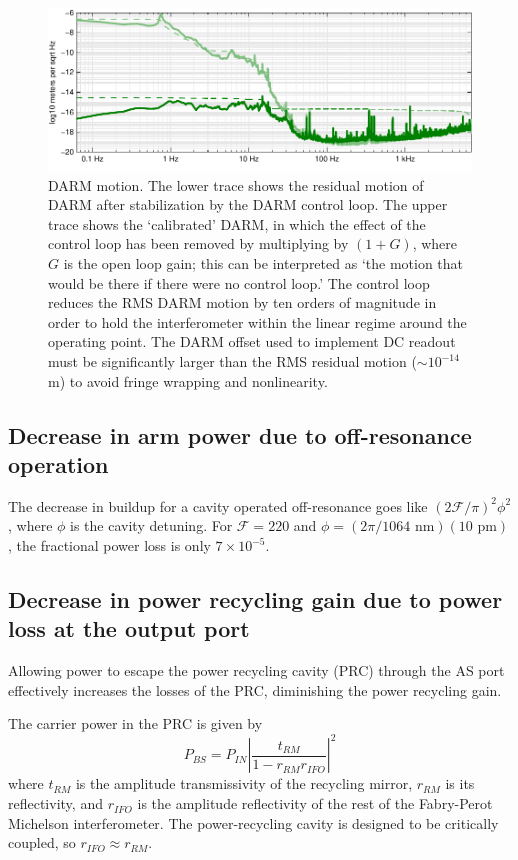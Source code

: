 \begin{figure}[p]
\centerline{\includegraphics[width=\columnwidth]{figures/residualDARM.pdf}}
\caption[Residual DARM motion]{\label{fig:residual-DARM}DARM
  motion. The lower trace shows the residual motion of DARM after
  stabilization by the DARM control loop.  The upper trace shows the
  `calibrated' DARM, in which the effect of the control loop has been
  removed by multiplying by $(1+G)$, where $G$ is the open loop gain;
  this can be interpreted as `the motion that would be there if there
  were no control loop.'  The control loop reduces the RMS DARM motion
  by ten orders of magnitude in order to hold the interferometer
  within the linear regime around the operating point.  The DARM
  offset used to implement DC readout must be significantly larger
  than the RMS residual motion ($\sim10^{-14}$ m) to avoid fringe
  wrapping and nonlinearity.}
\end{figure}

\subsection{Decrease in arm power due to off-resonance operation}

The decrease in buildup for a cavity operated off-resonance goes like
$(2\mathcal{F}/\pi)^2\phi^2$, where $\phi$ is the cavity detuning.
For $\mathcal{F}=220$ and $\phi=(2\pi/1064\text{ nm})(10\text{ pm})$,
the fractional power loss is only $7\times10^{-5}$.

\subsection{Decrease in power recycling gain due to power loss at the output port}

Allowing power to escape the power recycling cavity (PRC) through the
AS port effectively increases the losses of the PRC, diminishing the
power recycling gain.

The carrier power in the PRC is given by
\begin{equation}
P_{BS} = P_{IN}\left| \frac{t_{RM}}{1 - r_{RM} r_{IFO}}\right|^2
\end{equation}
where $t_{RM}$ is the amplitude transmissivity of the recycling
mirror, $r_{RM}$ is its reflectivity, and $r_{IFO}$ is the amplitude
reflectivity of the rest of the Fabry-Perot Michelson interferometer.
The power-recycling cavity is designed to be critically coupled, so
$r_{IFO}\approx r_{RM}$.


